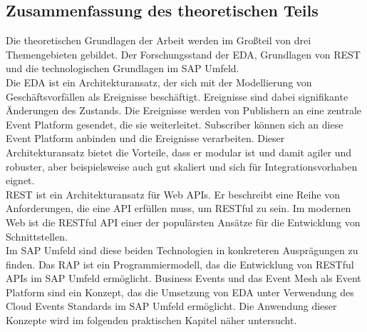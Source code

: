 \subsection{Zusammenfassung des theoretischen Teils}
Die theoretischen Grundlagen der Arbeit werden im Großteil von drei Themengebieten gebildet. Der Forschungsstand der \ac{EDA}, Grundlagen von REST und die technologischen Grundlagen im SAP Umfeld. \\
Die \ac{EDA} ist ein Architekturansatz, der sich mit der Modellierung von Geschäftsvorfällen als Ereignisse beschäftigt. Ereignisse sind dabei signifikante Änderungen des Zustands. Die Ereignisse werden von Publishern an eine zentrale Event Platform gesendet, die sie weiterleitet. Subscriber können sich an diese Event Platform anbinden und die Ereignisse verarbeiten. Dieser Architekturansatz bietet die Vorteile, dass er modular ist und damit agiler und robuster, aber beispielsweise auch gut skaliert und sich für Integrationsvorhaben eignet. \\
REST ist ein Architekturansatz für Web APIs. Er beschreibt eine Reihe von Anforderungen, die eine API erfüllen muss, um RESTful zu sein. Im modernen Web ist die RESTful API einer der populärsten Ansätze für die Entwicklung von Schnittstellen. \\
Im SAP Umfeld sind diese beiden Technologien in konkreteren Ausprägungen zu finden. Das \acs{RAP} ist ein Programmiermodell, das die Entwicklung von RESTful APIs im SAP Umfeld ermöglicht. Business Events und das Event Mesh als Event Platform sind ein Konzept, das die Umsetzung von \ac{EDA} unter Verwendung des Cloud Events Standards im SAP Umfeld ermöglicht. Die Anwendung dieser Konzepte wird im folgenden praktischen Kapitel näher untersucht.